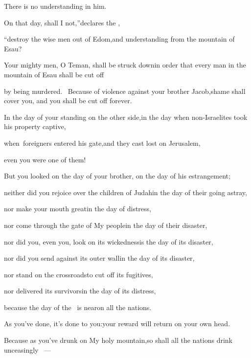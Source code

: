 \begin{inparaenum}
  \pc There is no understanding in him.%
  
  \pa {} On that day, shall I not,''\pa declares the \lord,%
  
  \pb ``destroy the wise men out of Edom,\pa and understanding from the mountain of Esau?%
  
  \pa {} Your mighty men, O Teman, shall be struck down\pa in order that every man in the mountain of Esau shall be cut off%
  
  \pb by being murdered.\  Because of violence against your brother Jacob,\pa shame shall cover you, and you shall be cut off forever.%
  
  \pa {} In the day of your standing on the other side,\pa in the day when non-Israelites took his property captive,%
  
  \pb when\understood\ foreigners entered his gate,\pa and they cast lost on Jerusalem,%
  
  \pb even you were one of them!%
  
  \pb {} But you looked on the day of your brother,%
  \pa on the day of his estrangement;%
  
  \pc neither did you rejoice over the children of Judah\pa in the day of their going astray,%
  
  \pc nor make your mouth great\pa in the day of distress,%
  
  \pb {} nor come through the gate of My people\pa in the day of their disaster,%
  
  \pc nor did you, even you, look on its wickedness\pa is the day of its disaster,%
  
  \pc nor did you send against its outer wall\pa in the day of its disaster,%
  
  \pb {} nor stand on the crossroads\pa to cut off its fugitives,%
  
  \pc nor delivered its survivors\pa in the day of its distress,%
  
  \pb {} because the day of the \lord\ is near\pa on all the nations.%
  
  \pc As you've done, it's done to you:\pa your reward will return on your own head.%
  
  \pa {} Because as you've drunk on My holy mountain,\pa so shall all the nations drink unceasingly%
  ~---%
  

\end{inparaenum}
